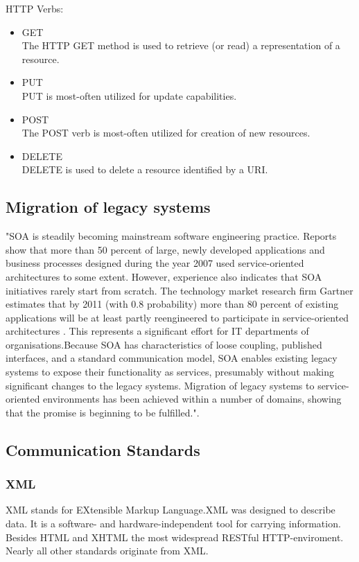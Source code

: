 \documentclass[12pt]{article}
\begin{document}
HTTP Verbs:
\begin{itemize}
\item GET\\
The HTTP GET method is used to retrieve (or read) a representation of a resource.
\item PUT\\
PUT is most-often utilized for update capabilities.
\item POST\\
The POST verb is most-often utilized for creation of new resources.
\item DELETE\\
DELETE is used to delete a resource identified by a URI.
\end{itemize}
\cite{RESTful}

\subsection{Migration of legacy systems}
"SOA is steadily becoming mainstream software engineering practice. Reports show that more than 50 percent of large, newly developed applications and business processes designed during the year 2007 used service-oriented architectures to some extent. However, experience also indicates that SOA initiatives rarely start from scratch. The technology market research firm Gartner estimates that by 2011 (with 0.8 probability) more than 80 percent of existing applications will be at least partly reengineered to participate in service-oriented architectures . This represents a significant effort for IT departments of organisations.Because SOA has characteristics of loose coupling, published interfaces, and a standard communication model, SOA enables existing legacy systems to expose their functionality as services, presumably without making significant changes to the legacy systems. Migration of legacy systems to service-oriented environments has been achieved within a number of domains, showing that the promise is beginning to be fulfilled."\cite{legacy}.
\\
\subsection{Communication Standards}

\subsubsection{XML}
XML stands for EXtensible Markup Language.XML was designed to describe data.
It is a software- and hardware-independent tool for carrying information.\\
Besides HTML and XHTML the most widespread RESTful HTTP-enviroment.\\
Nearly all other standards originate from XML.
\end{document}

